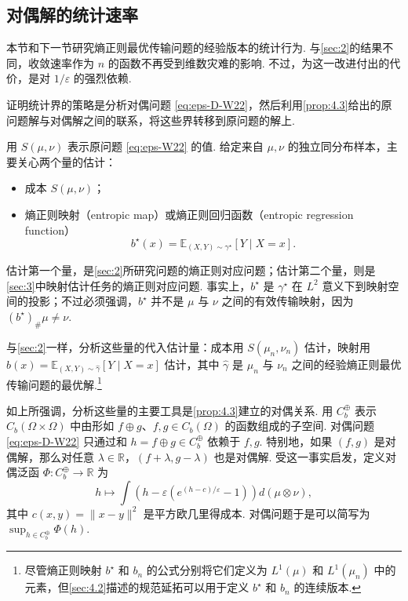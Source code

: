 \subsection{对偶解的统计速率}\label{sec:4.3}
本节和下一节研究熵正则最优传输问题的经验版本的统计行为. 与\autoref{sec:2}的结果不同，收敛速率作为 $n$ 的函数不再受到维数灾难的影响. 不过，为这一改进付出的代价，是对 $1/\varepsilon$ 的强烈依赖.

证明统计界的策略是分析对偶问题 \eqref{eq:eps-D-W22}，然后利用\autoref{prop:4.3}给出的原问题解与对偶解之间的联系，将这些界转移到原问题的解上.

用 $S(\mu,\nu)$ 表示原问题 \eqref{eq:eps-W22} 的值. 给定来自 $\mu,\nu$ 的独立同分布样本，主要关心两个量的估计：
\begin{itemize}
\item 成本 $S(\mu,\nu)$；
\item 熵正则映射（entropic map）或熵正则回归函数（entropic regression function）
$$b^\star(x)=\mathbb E_{(X,Y)\sim\gamma^\star}[Y\mid X=x].$$
\end{itemize}
估计第一个量，是\autoref{sec:2}所研究问题的熵正则对应问题；估计第二个量，则是\autoref{sec:3}中映射估计任务的熵正则对应问题. 事实上，$b^\star$ 是 $\gamma^\star$ 在 $L^2$ 意义下到映射空间的投影；不过必须强调，$b^\star$ 并不是 $\mu$ 与 $\nu$ 之间的有效传输映射，因为 $(b^\star)_\#\mu\ne\nu$.

与\autoref{sec:2}一样，分析这些量的代入估计量：成本用 $S(\mu_n,\nu_n)$ 估计，映射用 $\widehat b(x)=\mathbb E_{(X,Y)\sim\widehat\gamma}[Y\mid X=x]$ 估计，其中 $\widehat\gamma$ 是 $\mu_n$ 与 $\nu_n$ 之间的经验熵正则最优传输问题的最优解.\footnote{尽管熵正则映射 $b^\star$ 和 $b_n$ 的公式分别将它们定义为 $L^1(\mu)$ 和 $L^1(\mu_n)$ 中的元素，但\autoref{sec:4.2}描述的规范延拓可以用于定义 $b^\star$ 和 $b_n$ 的连续版本.}

如上所强调，分析这些量的主要工具是\autoref{prop:4.3}建立的对偶关系. 用 $C_b^\oplus$ 表示 $C_b(\Omega\times\Omega)$ 中由形如 $f\oplus g$、$f,g\in C_b(\Omega)$ 的函数组成的子空间. 对偶问题 \eqref{eq:eps-D-W22} 只通过和 $h=f\oplus g\in C_b^\oplus$ 依赖于 $f,g$. 特别地，如果 $(f,g)$ 是对偶解，那么对任意 $\lambda\in\mathbb R$，$(f+\lambda,g-\lambda)$ 也是对偶解. 受这一事实启发，定义对偶泛函 $\Phi:C_b^\oplus\to\mathbb R$ 为
\begin{equation}\label{eq:4.13}
h\longmapsto\int\left(h-\varepsilon(e^{(h-c)/\varepsilon}-1)\right)d(\mu\otimes\nu),
\end{equation}
其中 $c(x,y)=\|x-y\|^2$ 是平方欧几里得成本. 对偶问题于是可以简写为 $\sup_{h\in C_b^\oplus}\Phi(h)$.

